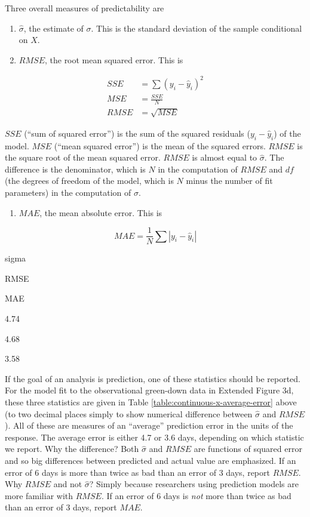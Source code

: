 \documentclass[]{book}
\providecommand{\tightlist}{%
  \setlength{\itemsep}{0pt}\setlength{\parskip}{0pt}}
\begin{document}
Three overall measures of predictability are

\begin{enumerate}
\def\labelenumi{\arabic{enumi}.}
\tightlist
\item
  \(\hat{\sigma}\), the estimate of \(\sigma\). This is the standard deviation of the sample conditional on \(X\).
\item
  \(RMSE\), the root mean squared error. This is
\end{enumerate}

\begin{align}
SSE &= \sum{(y_i - \hat{y}_i)^2}\\
MSE &= \frac{SSE}{N}\\
RMSE &= \sqrt{MSE}
\end{align}

\(SSE\) (``sum of squared error'') is the sum of the squared residuals (\(y_i - \hat{y}_i\)) of the model. \(MSE\) (``mean squared error'') is the mean of the squared errors. \(RMSE\) is the square root of the mean squared error. \(RMSE\) is almost equal to \(\hat{\sigma}\). The difference is the denominator, which is \(N\) in the computation of \(RMSE\) and \(df\) (the degrees of freedom of the model, which is \(N\) minus the number of fit parameters) in the computation of \(\hat{\sigma}\).

\begin{enumerate}
\def\labelenumi{\arabic{enumi}.}
\setcounter{enumi}{2}
\tightlist
\item
  \(MAE\), the mean absolute error. This is
\end{enumerate}

\begin{equation}
MAE = \frac{1}{N}\sum{|y_i - \hat{y}_i|}
\end{equation}

sigma

RMSE

MAE

4.74

4.68

3.58

If the goal of an analysis is prediction, one of these statistics should be reported. For the model fit to the observational green-down data in Extended Figure 3d, these three statistics are given in Table \ref{table:continuous-x-average-error} above (to two decimal places simply to show numerical difference between \(\hat{\sigma}\) and \(RMSE\)). All of these are measures of an ``average'' prediction error in the units of the response. The average error is either 4.7 or 3.6 days, depending on which statistic we report. Why the difference? Both \(\hat{\sigma}\) and \(RMSE\) are functions of squared error and so big differences between predicted and actual value are emphasized. If an error of 6 days is more than twice as bad than an error of 3 days, report \(RMSE\). Why \(RMSE\) and not \(\hat{\sigma}\)? Simply because researchers using prediction models are more familiar with \(RMSE\). If an error of 6 days is \emph{not} more than twice as bad than an error of 3 days, report \(MAE\).
\end{document}

